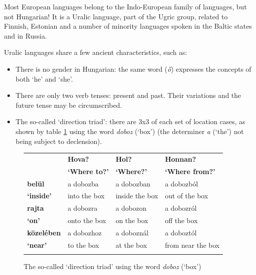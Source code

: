 \begin{multicols}{2}
  Most European languages belong to the Indo-European family of languages, but not Hungarian! It is a Uralic language, part of the Ugric group, related to Finnish, Estonian and a number of minority languages spoken in the Baltic states and in Russia.

  Uralic languages share a few ancient characteristics, such as: 

  \begin{itemize}
  \item There is no gender in Hungarian: the same word (\textit{ő}) expresses the concepts of both `he' and `she'. 
  \item There are only two verb tenses: present and past. Their variations and the future tense may be circumscribed. 
  \item The so-called `direction triad': there are 3x3 of each set of location cases, as shown by table \ref{doboz_en} using the word \textit{doboz} (`box') (the determiner \textit{a} (`the') not being subject to declension).
  \end{itemize}

  \begin{figure}[htb]
    \setlength{\tabcolsep}{2em}
    \begin{tabularx}{\textwidth}{llll} \toprule\addlinespace
      \textbf{} & \textbf{Hova?} & \textbf{Hol?} & \textbf{Honnan?}\\
      \textbf{} & \textbf{`Where to?'} & \textbf{`Where?'} & \textbf{`Where from?'}\\
       \addlinespace\midrule\addlinespace
      \textbf{belül} & a dobozba & a dobozban & a dobozból\\
      \textbf{`inside'} & into the box & inside the box & out of the box\\
      \addlinespace\midrule\addlinespace
      \textbf{rajta} & a dobozra & a dobozon & a dobozról\\
      \textbf{`on'} & onto the box & on the box & off the box\\ 
      \addlinespace\midrule\addlinespace
      \textbf{közelében} & a dobozhoz & a doboznál & a doboztól\\
      \textbf{`near'} & to the box & at the box & from near the box\\ \addlinespace\bottomrule
    \end{tabularx}
    \caption{The so-called `direction triad' using the word \textit{doboz} (`box')}
    \label{doboz_en}
  \end{figure}


\end{multicols}
